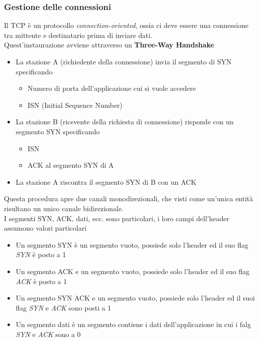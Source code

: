 \documentclass{article}
\newcounter{subsubsubsection}[subsubsection]
\begin{document}
            \subsubsection{Gestione delle connessioni}
                    Il TCP è un protocollo \textit{connection-oriented}, ossia ci deve essere una connessione tra mittente e destinatario prima di inviare dati.\\
                    Quest'instaurazione avviene attraverso un \textbf{Three-Way Handshake}
                    \begin{itemize}
                        \item La stazione A (richiedente della connessione) invia il segmento di SYN specificando
                              \begin{itemize}
                                  \item Numero di porta dell'applicazione cui si vuole accedere
                                  \item ISN (Initial Sequence Number)
                              \end{itemize}
                        \item La stazione B (ricevente della richiesta di connessione) risponde con un segmento SYN specificando
                              \begin{itemize}
                                  \item ISN
                                  \item ACK al segmento SYN di A
                              \end{itemize}
                        \item La stazione A riscontra il segmento SYN di B con un ACK
                    \end{itemize}
                    Questa procedura apre due canali monodirezionali, che visti come un'unica entità risultano un unico canale bidirezionale.\\
                    I segmenti SYN, ACK, dati, ecc. sono particolari, i loro campi dell'header assumono valori particolari
                    \begin{itemize}
                        \item Un segmento SYN è un segmento vuoto, possiede solo l'header ed il suo flag \textit{SYN} è posto a 1
                        \item Un segmento ACK e un segmento vuoto, possiede solo l'header ed il suo flag \textit{ACK} è posto a 1
                        \item Un segmento SYN ACK e un segmento vuoto, possiede solo l'header ed il suoi flag \textit{SYN} e \textit{ACK} sono posti a 1
                        \item Un segmento dati è un segmento contiene i dati dell'applicazione in cui i falg \textit{SYN} e \textit{ACK} sono a 0 
                    \end{itemize}
\end{document}
